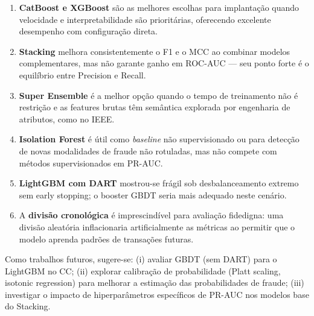 \documentclass[12pt,a4paper]{article}
\begin{document}
\begin{enumerate}
  \item \textbf{CatBoost e XGBoost} são as melhores escolhas para implantação
    quando velocidade e interpretabilidade são prioritárias, oferecendo
    excelente desempenho com configuração direta.

  \item \textbf{Stacking} melhora consistentemente o F1 e o MCC ao combinar
    modelos complementares, mas não garante ganho em ROC-AUC — seu ponto forte
    é o equilíbrio entre Precision e Recall.

  \item \textbf{Super Ensemble} é a melhor opção quando o tempo de treinamento
    não é restrição e as features brutas têm semântica explorada por engenharia
    de atributos, como no IEEE.

  \item \textbf{Isolation Forest} é útil como \textit{baseline} não
    supervisionado ou para detecção de novas modalidades de fraude não
    rotuladas, mas não compete com métodos supervisionados em PR-AUC.

  \item \textbf{LightGBM com DART} mostrou-se frágil sob desbalanceamento
    extremo sem early stopping; o booster GBDT seria mais adequado neste cenário.

  \item A \textbf{divisão cronológica} é imprescindível para avaliação fidedigna:
    uma divisão aleatória inflacionaria artificialmente as métricas ao permitir
    que o modelo aprenda padrões de transações futuras.
\end{enumerate}

Como trabalhos futuros, sugere-se: (i) avaliar GBDT (sem DART) para o LightGBM
no CC; (ii) explorar calibração de probabilidade (Platt scaling, isotonic
regression) para melhorar a estimação das probabilidades de fraude; (iii)
investigar o impacto de hiperparâmetros específicos de PR-AUC nos modelos base
do Stacking.
\end{document}
